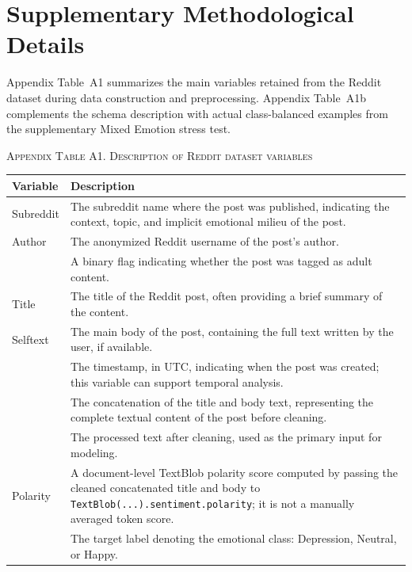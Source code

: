 \documentclass{ieeeaccess}
\begin{document}
\section{Supplementary Methodological Details}

Appendix Table~A1 summarizes the main variables retained from the Reddit dataset during data construction and preprocessing. Appendix Table~A1b complements the schema description with actual class-balanced examples from the supplementary Mixed Emotion stress test.

\par\medskip
\noindent\textsc{Appendix Table A1. Description of Reddit dataset variables}\par
\label{tab:appendix-a1-reddit-variables}
\smallskip
\small
\setlength{\tabcolsep}{4pt}
\renewcommand{\arraystretch}{1.18}
\noindent\begin{tabularx}{\textwidth}{@{}>{\raggedright\arraybackslash}p{}Y@{}}
\toprule
Variable & Description \\
\midrule
Subreddit & The subreddit name where the post was published, indicating the context, topic, and implicit emotional milieu of the post. \\
Author & The anonymized Reddit username of the post's author. \\
 & A binary flag indicating whether the post was tagged as adult content. \\
Title & The title of the Reddit post, often providing a brief summary of the content. \\
Selftext & The main body of the post, containing the full text written by the user, if available. \\
 & The timestamp, in UTC, indicating when the post was created; this variable can support temporal analysis. \\
 & The concatenation of the title and body text, representing the complete textual content of the post before cleaning. \\
 & The processed text after cleaning, used as the primary input for modeling. \\
Polarity & A document-level TextBlob polarity score computed by passing the cleaned concatenated title and body to \texttt{TextBlob(...).sentiment.polarity}; it is not a manually averaged token score. \\
 & The target label denoting the emotional class: Depression, Neutral, or Happy. \\
\bottomrule
\end{tabularx}
\par\medskip
\end{document}
